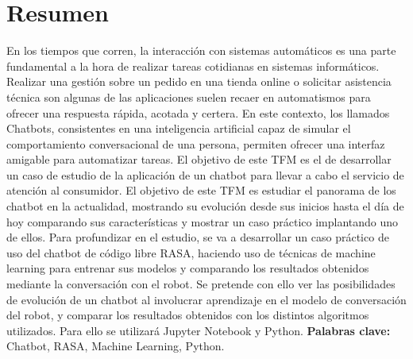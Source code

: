 \cleardoublepage
{}
\chapter*{Resumen}
En los tiempos que corren, la interacción con sistemas automáticos es una parte fundamental a la hora de realizar tareas cotidianas en sistemas informáticos. Realizar una gestión sobre un pedido en una tienda online o solicitar asistencia técnica son algunas de las aplicaciones suelen recaer en automatismos para ofrecer una respuesta rápida, acotada y certera. En este contexto, los llamados Chatbots, consistentes en una inteligencia artificial capaz de simular el comportamiento conversacional de una persona, permiten ofrecer una interfaz amigable para automatizar tareas. El objetivo de este TFM es el de desarrollar un caso de estudio de la aplicación de un chatbot para llevar a cabo el servicio de atención al consumidor. El objetivo de este TFM es estudiar el panorama de los chatbot en la actualidad, mostrando su evolución desde sus inicios hasta el día de hoy comparando sus características y mostrar un caso práctico implantando uno de ellos. Para profundizar en el estudio, se va a desarrollar un caso práctico de uso del chatbot de código libre RASA, haciendo uso de técnicas de machine learning para entrenar sus modelos y comparando los resultados obtenidos mediante la conversación con el robot. Se pretende con ello ver las posibilidades de evolución de un chatbot al involucrar aprendizaje en el modelo de conversación del robot, y comparar los resultados obtenidos con los distintos algoritmos utilizados. Para ello se utilizará Jupyter Notebook y Python.
\vfill
\textbf{Palabras clave:} Chatbot, RASA, Machine Learning, Python.